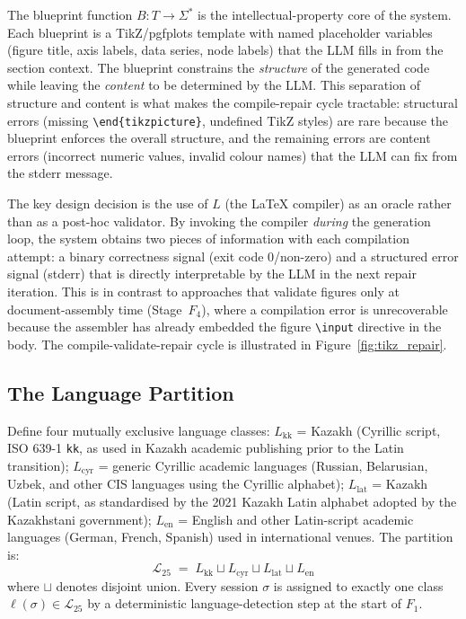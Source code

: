 The blueprint function $B: T\to\Sigma^*$ is the intellectual-property core of the
\tvg{} system.
Each blueprint is a TikZ/pgfplots template with named placeholder variables
(figure title, axis labels, data series, node labels) that the LLM fills in from
the section context.
The blueprint constrains the \emph{structure} of the generated code while leaving
the \emph{content} to be determined by the LLM.
This separation of structure and content is what makes the compile-repair cycle
tractable: structural errors (missing \texttt{\textbackslash end\{tikzpicture\}},
undefined TikZ styles) are rare because the blueprint enforces the overall structure,
and the remaining errors are content errors (incorrect numeric values, invalid colour
names) that the LLM can fix from the stderr message.

The key design decision is the use of $L$ (the \LaTeX{} compiler) as an oracle
rather than as a post-hoc validator.
By invoking the compiler \emph{during} the generation loop, the system obtains two
pieces of information with each compilation attempt: a binary correctness signal
(exit code 0/non-zero) and a structured error signal (stderr) that is directly
interpretable by the LLM in the next repair iteration.
This is in contrast to approaches that validate figures only at document-assembly
time (Stage~$F_4$), where a compilation error is unrecoverable because the assembler
has already embedded the figure \texttt{\textbackslash input} directive in the body.
The compile-validate-repair cycle is illustrated in Figure~\ref{fig:tikz_repair}.



\subsection{The Language Partition}

\begin{definition}
\label{def:language}
Define four mutually exclusive language classes:
$L_{\mathrm{kk}}$ = Kazakh (Cyrillic script, ISO 639-1 \texttt{kk}, as used in
Kazakh academic publishing prior to the Latin transition);
$L_{\mathrm{cyr}}$ = generic Cyrillic academic languages (Russian, Belarusian, Uzbek,
and other CIS languages using the Cyrillic alphabet);
$L_{\mathrm{lat}}$ = Kazakh (Latin script, as standardised by the 2021 Kazakh Latin
alphabet adopted by the Kazakhstani government);
$L_{\mathrm{en}}$ = English and other Latin-script academic languages (German, French,
Spanish) used in international venues.
The partition is:
\[
  \mathcal{L}_{25} \;=\; L_{\mathrm{kk}} \sqcup L_{\mathrm{cyr}} \sqcup L_{\mathrm{lat}} \sqcup L_{\mathrm{en}}
\]
where $\sqcup$ denotes disjoint union.
Every session $\sigma$ is assigned to exactly one class $\ell(\sigma)\in\mathcal{L}_{25}$
by a deterministic language-detection step at the start of $F_1$.
\end{definition}


